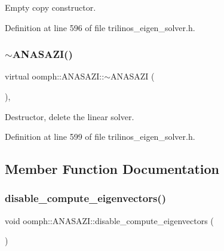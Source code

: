 Empty copy constructor. 



Definition at line 596 of file trilinos\+\_\+eigen\+\_\+solver.\+h.

\mbox{\label{classoomph_1_1ANASAZI_a3f7e7f7fdc23c04c419fba24474f95a7}} 
\subsubsection{\texorpdfstring{$\sim$\+A\+N\+A\+S\+A\+Z\+I()}{~ANASAZI()}}
{\footnotesize\ttfamily virtual oomph\+::\+A\+N\+A\+S\+A\+Z\+I\+::$\sim$\+A\+N\+A\+S\+A\+ZI (\begin{DoxyParamCaption}{ }\end{DoxyParamCaption})\hspace{0.3cm}{\ttfamily [inline]}, {\ttfamily [virtual]}}



Destructor, delete the linear solver. 



Definition at line 599 of file trilinos\+\_\+eigen\+\_\+solver.\+h.



\subsection{Member Function Documentation}
\mbox{\label{classoomph_1_1ANASAZI_a7e2035b9291fdc43d9e514c2f97a2b95}} 
\subsubsection{\texorpdfstring{disable\+\_\+compute\+\_\+eigenvectors()}{disable\_compute\_eigenvectors()}}
{\footnotesize\ttfamily void oomph\+::\+A\+N\+A\+S\+A\+Z\+I\+::disable\+\_\+compute\+\_\+eigenvectors (\begin{DoxyParamCaption}{ }\end{DoxyParamCaption})\hspace{0.3cm}{\ttfamily [inline]}}



